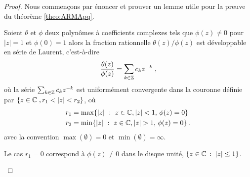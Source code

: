 \begin{proof}
Nous commen\c{c}ons par \'enoncer et prouver un lemme utile pour la preuve
du th\'eor\`eme \ref{theo:ARMApq}.
\begin{lemma}\label{lem:dev_laurent}
  Soient $\theta$ et $\phi$ deux polyn\^omes \`a coefficients complexes tels que
  $\phi(z) \neq 0$ pour $|z|=1$ et $\phi(0)=1$ alors la fraction rationnelle
  $\theta(z)/\phi(z)$ est d\'eveloppable en s\'erie de Laurent, c'est-\`a-dire
$$
\frac{\theta(z)}{\phi(z)}=\sum_{k\in\mathbb{Z}} c_k z^{-k}\;,
$$
o\`u la s\'erie $\sum_{k \in \mathbb{Z}} c_k z^{-k}$ est uniform\'ement convergente dans la
couronne d\'efinie par
$\left\{ z\in\cset \eqsp, r_1<|z|<r_2 \right\}$, o\`u
\begin{align*}
r_1&=\max\{ |z|~:~ z \in \mathbb{C}, | z | < 1, \,\phi(z) =0 \}\\
r_2&=\min\{ |z|~:~ z  \in \mathbb{C}, |z| > 1, \,\phi(z) = 0 \}\; .
\end{align*}
avec la convention $\max(\emptyset)=0$ et $\min(\emptyset)=\infty$.

Le cas $r_1=0$ correspond \`a $\phi(z)\neq0$ dans le disque unité,
$\left\{z \in \mathbb{C}\,:\; |z|\leq1\right\}$.


\end{lemma}
\end{proof}
